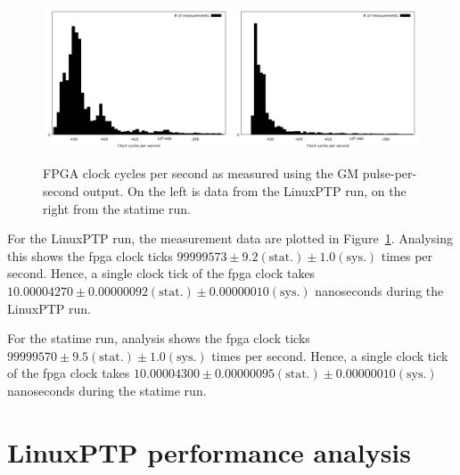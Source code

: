 \documentclass{article}
\begin{document}
\begin{figure}[h]
\includegraphics[width=0.5\textwidth]{gm_secs_stat_ref.pdf}\includegraphics[width=0.5\textwidth]{gm_secs_stat_statime.pdf}
\caption{FPGA clock cycles per second as measured using the GM pulse-per-second output. On the left is data from the LinuxPTP run, on the right from the statime run.}
\label{fig:gm_cycles_per_second}
\end{figure}

For the LinuxPTP run, the measurement data are plotted in Figure~\ref{fig:gm_cycles_per_second}. Analysing this shows the fpga clock ticks $99999573\pm 9.2 (\text{stat.}) \pm 1.0 (\text{sys.})$ times per second. Hence, a single clock tick of the fpga clock takes $10.00004270 \pm 0.00000092 (\text{stat.}) \pm 0.00000010 (\text{sys.})$ nanoseconds during the LinuxPTP run.

For the statime run, analysis shows the fpga clock ticks $ 99999570 \pm 9.5 (\text{stat.}) \pm 1.0 (\text{sys.})$ times per second. Hence, a single clock tick of the fpga clock takes $10.00004300 \pm 0.00000095 (\text{stat.}) \pm 0.00000010 (\text{sys.})$ nanoseconds during the statime run.

\section {LinuxPTP performance analysis}
\end{document}
